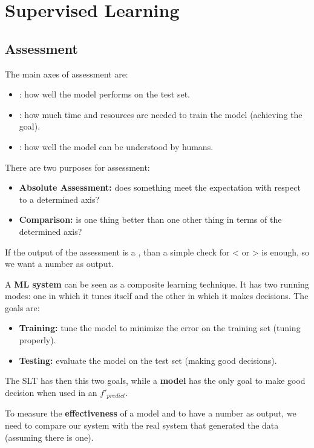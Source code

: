 
\chapter{Supervised Learning}

\section{Assessment}

The main axes of assessment are:
\begin{itemize}
    \item {}: how well the model performs on the test set.
    \item {}: how much time and resources are needed to train the model (achieving the goal).
    \item {}: how well the model can be understood by humans.
\end{itemize}

There are two purposes for assessment:
\begin{itemize}
    \item \textbf{Absolute Assessment:} does something meet the expectation with respect to a determined axis?
    \item \textbf{Comparison:} is one thing better than one other thing in terms of the determined axis? 
\end{itemize}

If the output of the assessment is a , than a simple check for < or > is enough, so we want a number as output.

A \textbf{ML system} can be seen as a composite learning technique. It has two running modes: one in which it tunes itself and the other in which it makes decisions. The goals are:
\begin{itemize}
    \item \textbf{Training:} tune the model to minimize the error on the training set (tuning properly).
    \item \textbf{Testing:} evaluate the model on the test set (making good decisions).
\end{itemize}

The SLT has then this two goals, while a \textbf{model} has the only goal to make good decision when used in an $f'_{predict}$.

To measure the \textbf{effectiveness} of a model and to have a number as output, we need to compare our system with the real system that generated the data (assuming there is one).

